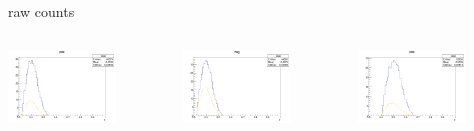 \begin{frame}{raw counts}
\begin{columns}
\begin{column}[T]{0.25\textwidth}
\includegraphics[width = 0.7\textwidth]{results/yield/statistics/yield_x_Q2_z_0.45_3.898_0.40_pos.png}
\end{column}
\begin{column}[T]{0.25\textwidth}
\includegraphics[width = 0.7\textwidth]{results/yield/statistics/yield_x_Q2_z_0.45_3.898_0.40_neg.png}
\end{column}
\begin{column}[T]{0.25\textwidth}
\includegraphics[width = 0.7\textwidth]{results/yield/statistics/yield_x_Q2_z_0.45_3.898_0.50_pos.png}

\end{column}
\end{columns}
\end{frame}
